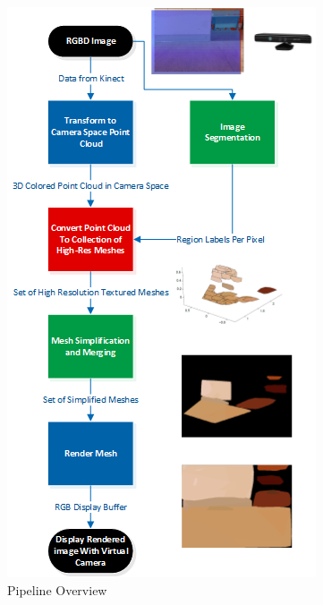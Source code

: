 \documentclass[letterpaper, 10 pt, conference]{ieeeconf}
\begin{document}
\begin{figure}[!ht]
    \centering
    \includegraphics[scale=1.0]{pipelineflowchart.png}
    \caption{Pipeline Overview}
    \label{fig:pipeline}
\end{figure}

\end{document}
